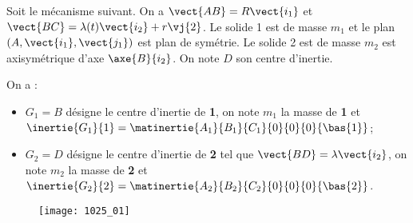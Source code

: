 \normaltrue
\correctionfalse


\setcounter{question}{0}%



\ifcorrection
\else
{}
\fi

\ifprof
\else

Soit le mécanisme suivant. On a $\vect{AB}=R\vect{i_1}$ et $\vect{BC}=\lambda(t)\vect{i_2}+r\vj{2}$. Le solide 1 est de masse $m_1$ et le plan $\left(A,\vect{i_1},\vect{j_1}\right)$ est plan de symétrie. Le solide 2 est de masse $m_2$ est axisymétrique d'axe $\axe{B}{i_2}$. On note $D$ son centre d'inertie.


On a :
\begin{itemize}
\item $G_1=B$ désigne le centre d'inertie de \textbf{1}, on note $m_1$ la masse de \textbf{1} et $\inertie{G_1}{1}=\matinertie{A_1}{B_1}{C_1}{0}{0}{0}{\bas{1}}$; 
\item $G_2=D$ désigne le centre d'inertie de \textbf{2} tel que  $\vect{BD}=\lambda\vect{i_2}$, on note $m_2$ la masse de \textbf{2} et $\inertie{G_2}{2}=\matinertie{A_2}{B_2}{C_2}{0}{0}{0}{\bas{2}}$.
\end{itemize}

\begin{figure}[H]
\texttt{[image: 1025\_01]}
\end{figure}
\fi

\ifprof~\\
\else
\fi

\ifprof~\\
\else
\fi

\ifprof~\\
\else
\fi

\ifcolle
{}
\ifprof~\\
\else
\fi
\else
\fi

\ifprof
\else
{}
\fi